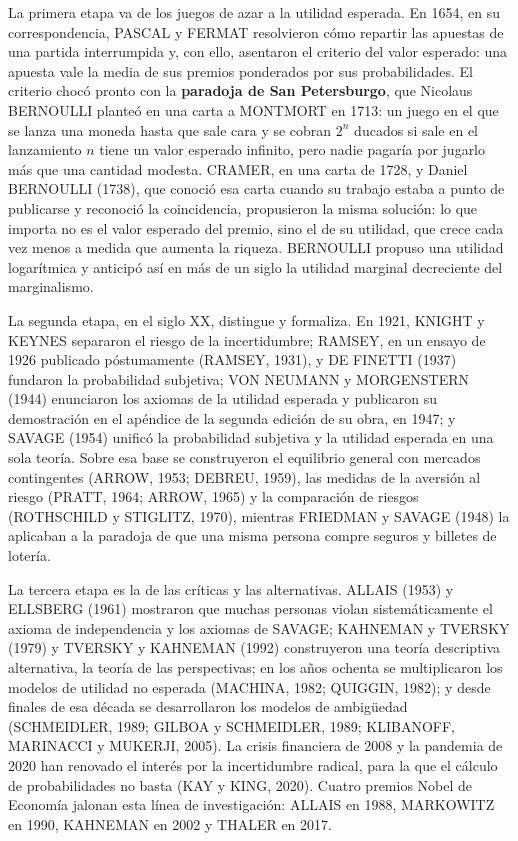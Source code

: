 \documentclass[10pt,a4paper]{article}
\begin{document}
La primera etapa va de los juegos de azar a la utilidad esperada. En 1654, en su correspondencia, PASCAL y FERMAT resolvieron cómo repartir las apuestas de una partida interrumpida y, con ello, asentaron el criterio del valor esperado: una apuesta vale la media de sus premios ponderados por sus probabilidades. El criterio chocó pronto con la \textbf{paradoja de San Petersburgo}, que Nicolaus BERNOULLI planteó en una carta a MONTMORT en 1713: un juego en el que se lanza una moneda hasta que sale cara y se cobran $2^n$ ducados si sale en el lanzamiento $n$ tiene un valor esperado infinito, pero nadie pagaría por jugarlo más que una cantidad modesta. CRAMER, en una carta de 1728, y Daniel BERNOULLI (1738), que conoció esa carta cuando su trabajo estaba a punto de publicarse y reconoció la coincidencia, propusieron la misma solución: lo que importa no es el valor esperado del premio, sino el de su utilidad, que crece cada vez menos a medida que aumenta la riqueza. BERNOULLI propuso una utilidad logarítmica y anticipó así en más de un siglo la utilidad marginal decreciente del marginalismo.

La segunda etapa, en el siglo XX, distingue y formaliza. En 1921, KNIGHT y KEYNES separaron el riesgo de la incertidumbre; RAMSEY, en un ensayo de 1926 publicado póstumamente (RAMSEY, 1931), y DE FINETTI (1937) fundaron la probabilidad subjetiva; VON NEUMANN y MORGENSTERN (1944) enunciaron los axiomas de la utilidad esperada y publicaron su demostración en el apéndice de la segunda edición de su obra, en 1947; y SAVAGE (1954) unificó la probabilidad subjetiva y la utilidad esperada en una sola teoría. Sobre esa base se construyeron el equilibrio general con mercados contingentes (ARROW, 1953; DEBREU, 1959), las medidas de la aversión al riesgo (PRATT, 1964; ARROW, 1965) y la comparación de riesgos (ROTHSCHILD y STIGLITZ, 1970), mientras FRIEDMAN y SAVAGE (1948) la aplicaban a la paradoja de que una misma persona compre seguros y billetes de lotería.

La tercera etapa es la de las críticas y las alternativas. ALLAIS (1953) y ELLSBERG (1961) mostraron que muchas personas violan sistemáticamente el axioma de independencia y los axiomas de SAVAGE; KAHNEMAN y TVERSKY (1979) y TVERSKY y KAHNEMAN (1992) construyeron una teoría descriptiva alternativa, la teoría de las perspectivas; en los años ochenta se multiplicaron los modelos de utilidad no esperada (MACHINA, 1982; QUIGGIN, 1982); y desde finales de esa década se desarrollaron los modelos de ambigüedad (SCHMEIDLER, 1989; GILBOA y SCHMEIDLER, 1989; KLIBANOFF, MARINACCI y MUKERJI, 2005). La crisis financiera de 2008 y la pandemia de 2020 han renovado el interés por la incertidumbre radical, para la que el cálculo de probabilidades no basta (KAY y KING, 2020). Cuatro premios Nobel de Economía jalonan esta línea de investigación: ALLAIS en 1988, MARKOWITZ en 1990, KAHNEMAN en 2002 y THALER en 2017.
\end{document}

